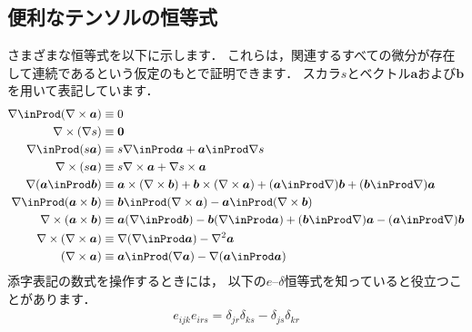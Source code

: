 \subsection{便利なテンソルの恒等式}
\label{ssec:1.3.8}
さまざまな恒等式を以下に示します．
これらは，関連するすべての微分が存在して連続であるという仮定のもとで証明できます．
スカラ$s$とベクトル$\bm{a}$および$\bm{b}$を用いて表記しています．
\begin{align}
 \label{eq:1.29}
 \begin{aligned}
  \nabla \inProd (\nabla \times \bm{a}) &\equiv 0 \\
  \nabla \times (\nabla s) &\equiv \bm{0} \\
  \nabla \inProd (s\bm{a}) &\equiv s\nabla \inProd \bm{a} + \bm{a} \inProd \nabla s \\
  \nabla \times (s\bm{a}) &\equiv s\nabla \times \bm{a} + \nabla s \times \bm{a} \\
  \nabla (\bm{a} \inProd \bm{b})
    &\equiv \bm{a} \times (\nabla \times \bm{b}) + \bm{b} \times (\nabla \times \bm{a})
            + (\bm{a} \inProd \nabla)\bm{b} + (\bm{b} \inProd \nabla)\bm{a} \\
  \nabla \inProd (\bm{a} \times \bm{b})
    &\equiv \bm{b} \inProd (\nabla \times \bm{a}) - \bm{a} \inProd (\nabla \times \bm{b}) \\
  \nabla \times (\bm{a} \times \bm{b})
    &\equiv \bm{a}(\nabla \inProd \bm{b}) - \bm{b}(\nabla \inProd \bm{a})
            + (\bm{b} \inProd \nabla)\bm{a} - (\bm{a} \inProd \nabla)\bm{b} \\
  \nabla \times (\nabla \times \bm{a})
    &\equiv \nabla (\nabla \inProd \bm{a}) - \nabla^{2}\bm{a} \\
  (\nabla \times \bm{a})
    &\equiv \bm{a} \inProd (\nabla \bm{a}) - \nabla (\bm{a} \inProd \bm{a})
 \end{aligned}
\end{align}
添字表記の数式を操作するときには，
以下の$e$--$\delta$恒等式を知っていると役立つことがあります．
\begin{align}
 \label{eq:1.30}
 e_{ijk}e_{irs} = \delta_{jr}\delta_{ks} - \delta_{js}\delta_{kr}
\end{align}


